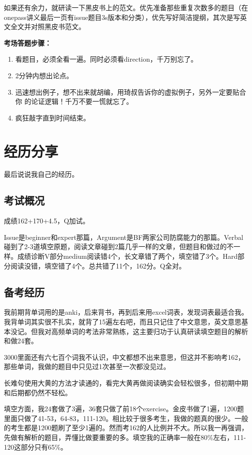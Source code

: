 \documentclass[cn,plain]{elegantbookex}
\begin{document}
如果还有余力，就研读一下黑皮书上的范文。优先准备那些重复次数多的题目（在onepass讲义最后一页有issue题目3s版本和分类），优先写好简洁提纲，其次是写英文全文并对照黑皮书范文。

\textbf{考场答题步骤：}
\begin{enumerate}
\item 看题目，必须全看一遍。同时必须看direction，千万别忘了。
\item 2分钟内想出论点。
\item 迅速想出例子，想不出来就胡编，用琦叔告诉你的虚拟例子，另外一定要贴合你
的论证逻辑！千万不要一慌就忘了。
\item 疯狂敲字直到时间结束。
\end{enumerate}

\chapter{经历分享}
最后说说我自己的经历。

\section{考试概况}
成绩162+170+4.5，Q加试。

Issue是beginner和expert那篇，Argument是BF两家公司防腐能力的那篇。Verbal碰到了2-3道填空原题，阅读文章碰到2篇几乎一样的文章，但题目和做过的不一样。成绩诊断V部分medium阅读错4个，长文章错了两个，填空错了3个。Hard部分阅读没错，填空错了4个。总共错了11个，162分。Q全对。

\section{备考经历}
我前期背单词用的是anki，后来背书，再到后来用excel词表，发现词表最适合我。我背单词其实很不扎实，就背了15遍左右吧，而且只记住了中文意思，英文意思基本没记。但我对高频单词的考法非常熟练，这主要归功于认真研读填空题目的解析和做24套。

3000里面还有六七百个词我不认识，中文都想不出来意思，但这并不影响考162，那些单词，我做的题目中只见过1次甚至一次都没见过。

长难句使用大黄的方法才读通的，看完大黄再做阅读确实会轻松很多，但初期中期和后期都仍然不轻松。

填空方面，我24套做了3遍，36套只做了前18个exercise。金皮书做了1遍，1200题里面只做了41-53，64-83，111-120。相比较于很多考生，我做的题真的很少。一般的考生都是1200题刷了至少1遍的。然而考162的人比例并不大。所以我一再强调，先做有解析的题目，弄懂比做要重要的多。填空我的正确率一般在80\%左右，111-120这部分只有65\%。
\end{document}
